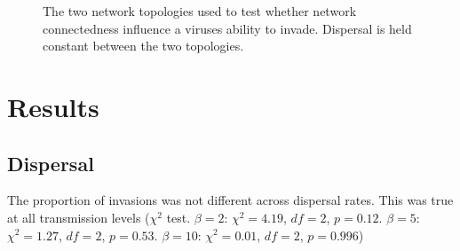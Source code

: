\begin{figure}[b]
\caption[Network structure]{The two network topologies used to test whether network connectedness influence a viruses ability to invade. Dispersal is held constant between the two topologies.}
\label{f:net}
\end{figure}







\clearpage
\section{Results}





\subsection{Dispersal}


The proportion of invasions was not different across dispersal rates. This was true at all transmission levels ($\chi^2$ test. $\beta = 2$: $\chi^2 = 4.19$, $df = 2$, $p = 0.12$. $\beta = 5$: $\chi^2 = 1.27$, $df = 2$, $p = 0.53$. $\beta = 10$: $\chi^2 = 0.01$, $df = 2$, $p = 0.996$)


